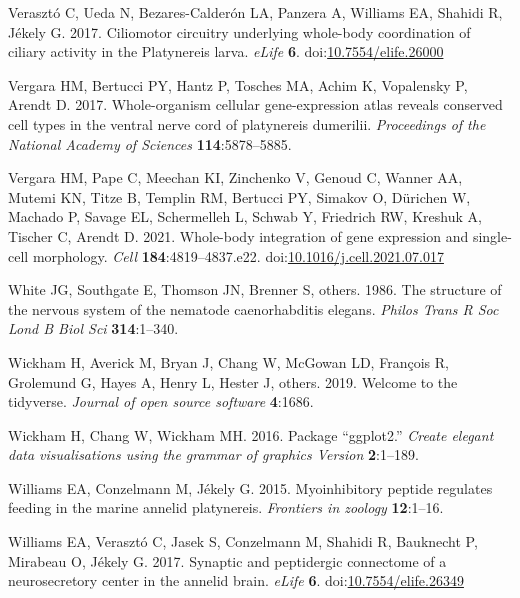 \documentclass[
  11pt,
]{article}
\newlength{\cslhangindent}
\newenvironment{CSLReferences}[2] %
 {\begin{list}{}{%
  \setlength{\itemindent}{0pt}
  \setlength{\leftmargin}{0pt}
  \setlength{\parsep}{0pt}
  \ifodd #1
   \setlength{\leftmargin}{\cslhangindent}
   \setlength{\itemindent}{-1\cslhangindent}
  \fi
  \setlength{\itemsep}{#2\baselineskip}}}
 {\end{list}}
\begin{document}
\begin{CSLReferences}{1}{0}
Verasztó C, Ueda N, Bezares-Calderón LA, Panzera A, Williams EA, Shahidi
R, Jékely G. 2017. Ciliomotor circuitry underlying whole-body
coordination of ciliary activity in the Platynereis larva. \emph{eLife}
\textbf{6}.
doi:\href{https://doi.org/10.7554/elife.26000}{10.7554/elife.26000}

Vergara HM, Bertucci PY, Hantz P, Tosches MA, Achim K, Vopalensky P,
Arendt D. 2017. Whole-organism cellular gene-expression atlas reveals
conserved cell types in the ventral nerve cord of platynereis dumerilii.
\emph{Proceedings of the National Academy of Sciences}
\textbf{114}:5878--5885.

Vergara HM, Pape C, Meechan KI, Zinchenko V, Genoud C, Wanner AA, Mutemi
KN, Titze B, Templin RM, Bertucci PY, Simakov O, Dürichen W, Machado P,
Savage EL, Schermelleh L, Schwab Y, Friedrich RW, Kreshuk A, Tischer C,
Arendt D. 2021. Whole-body integration of gene expression and
single-cell morphology. \emph{Cell} \textbf{184}:4819--4837.e22.
doi:\href{https://doi.org/10.1016/j.cell.2021.07.017}{10.1016/j.cell.2021.07.017}

White JG, Southgate E, Thomson JN, Brenner S, others. 1986. The
structure of the nervous system of the nematode caenorhabditis elegans.
\emph{Philos Trans R Soc Lond B Biol Sci} \textbf{314}:1--340.

Wickham H, Averick M, Bryan J, Chang W, McGowan LD, François R,
Grolemund G, Hayes A, Henry L, Hester J, others. 2019. Welcome to the
tidyverse. \emph{Journal of open source software} \textbf{4}:1686.

Wickham H, Chang W, Wickham MH. 2016. Package {``ggplot2.''}
\emph{Create elegant data visualisations using the grammar of graphics
Version} \textbf{2}:1--189.

Williams EA, Conzelmann M, Jékely G. 2015. Myoinhibitory peptide
regulates feeding in the marine annelid platynereis. \emph{Frontiers in
zoology} \textbf{12}:1--16.

Williams EA, Verasztó C, Jasek S, Conzelmann M, Shahidi R, Bauknecht P,
Mirabeau O, Jékely G. 2017. Synaptic and peptidergic connectome of a
neurosecretory center in the annelid brain. \emph{eLife} \textbf{6}.
doi:\href{https://doi.org/10.7554/elife.26349}{10.7554/elife.26349}


\end{CSLReferences}
\end{document}
